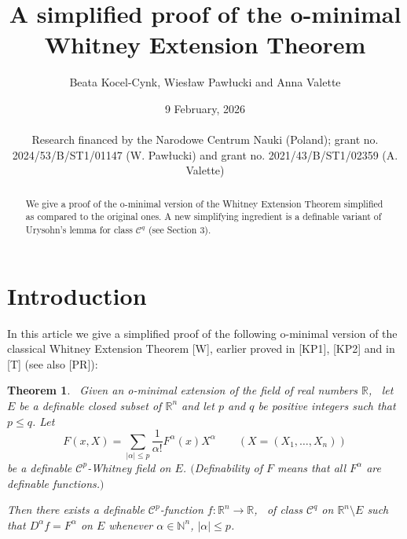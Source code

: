 \documentclass[12pt]{amsart}
\newtheorem{thm}{Theorem}[section]
\theoremstyle{definition}
\theoremstyle{remark}
\numberwithin{equation}{section}
\newcommand{\Real}{\mathbb R}
\begin{document}
\title[]{A simplified proof of the o-minimal Whitney Extension Theorem}%
\author{Beata Kocel-Cynk, Wies{\l}aw Paw{\l}ucki and Anna Valette}%

\address{(B. Kocel-Cynk) Instytut Matematyki Politechniki Krakowskiej, ul. Warszawska 24, 31-155 Kraków, Poland}%
%

\address{(W. Pawłucki) Instytut Matematyki Uniwersytetu Jagiellońskiego, ul. Prof. St. Łojasiewicza 6, 30-048 Kraków, Poland}%
%

\address{(A. Valette) Katedra Teorii Optymalizacji i Sterowania Uniwersytetu Jagiellońskiego, ul. Prof. St. Łojasiewicza 6, 30-048 Kraków, Poland}%
%


%
%

\date{9 February, 2026
$\phantom{......................................................................................................................}$
Research financed by the Narodowe Centrum Nauki (Poland); grant no. 2024/53/B/ST1/01147 (W. Pawłucki) and grant no. 2021/43/B/ST1/02359 (A. Valette)}
\begin{abstract} We give a proof of the o-minimal version of the Whitney Extension Theorem simplified as compared to the original ones. A new simplifying ingredient is a definable variant of Urysohn's lemma for class $\mathcal{C}^q$ (see Section 3).
\end{abstract}
\maketitle
\section{Introduction}

In this article we give a simplified proof of the following o-minimal version of the classical Whitney Extension Theorem [W], earlier proved in [KP1], [KP2] and in [T] (see also [PR]):

\medskip
\begin{thm} \, Given an o-minimal extension of the field of real numbers $\Real$, \, let $E$ be a definable closed subset of $\Real^n$ and let $p$ and $q$ be positive integers such that $p\leq q$. Let
$$
F(x, X) = \sum_{|\alpha|\leq p}\frac{1}{\alpha!}F^{\alpha}(x)X^{\alpha} \qquad (X = (X_1,\dots, X_n))
$$
be a definable $\mathcal{C}^p$-Whitney field on $E$. $($Definability of $F$ means that all $F^{\alpha}$ are definable functions.$)$

\medskip
Then there exists a definable $\mathcal{C}^p$-function $f: \Real^n\longrightarrow \Real$, \, of class $\mathcal{C}^q$ on $\Real^n \setminus E$ such that $D^{\alpha}f =F^{\alpha}$ on $E$ whenever $\alpha\in \mathbb{N}^n$, $|\alpha|\leq p$.
\end{thm}
\end{document}
